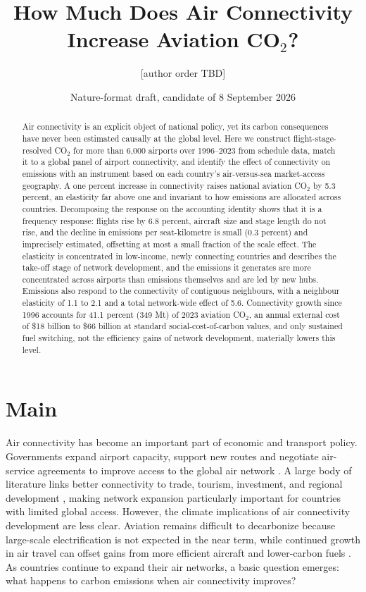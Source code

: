 \documentclass[12pt]{extarticle}
\title{How Much Does Air Connectivity Increase Aviation CO$_2$?}
\author{[author order TBD]}
\date{Nature-format draft, candidate of 8 September 2026}
\begin{document}
\maketitle

\begin{abstract}
\noindent Air connectivity is an explicit object of national policy, yet its
carbon consequences have never been estimated causally at the global level.
Here we construct flight-stage-resolved CO$_2$ for more than 6{,}000
airports over 1996--2023 from schedule data, match it to a global panel of
airport connectivity, and identify the effect of connectivity on emissions
with an instrument based on each country's air-versus-sea market-access
geography. A one percent increase in connectivity raises national aviation
CO$_2$ by 5.3 percent, an elasticity far above one and invariant to how
emissions are allocated across countries. Decomposing the response on the
accounting identity shows that it is a frequency response: flights rise by
6.8 percent, aircraft size and stage length do not rise, and the decline in
emissions per seat-kilometre is small (0.3 percent) and imprecisely
estimated, offsetting at most a small fraction of the scale effect. 
The elasticity is concentrated in low-income, newly connecting
countries and describes the take-off stage of network development, and
the emissions it generates are more concentrated across airports than
emissions themselves and are led by new hubs. Emissions also respond to the
connectivity of contiguous neighbours, with a neighbour elasticity of 1.1
to 2.1 and a total network-wide effect of 5.6. Connectivity growth since
1996 accounts for 41.1 percent (349 Mt) of 2023 aviation CO$_2$, an annual
external cost of \$18 billion to \$66 billion at standard social-cost-of-carbon
values, and only sustained fuel switching, not the efficiency gains of
network development, materially lowers this level.
\end{abstract}

\section*{Main}
Air connectivity has become an important part of economic and transport
policy. Governments expand airport capacity, support new routes and
negotiate air-service agreements to improve access to the global air
network \citep{fageda2018,piermartini2013}. A large body of literature
links better connectivity to trade, tourism, investment, and regional
development \citep{lenaerts2021,zhang2020}, making network expansion
particularly important for countries with limited global access. However,
the climate implications of air connectivity development are less clear.
Aviation remains difficult to decarbonize because large-scale
electrification is not expected in the near term, while continued growth
in air travel can offset gains from more efficient aircraft and
lower-carbon fuels \citep{bergero2023,sacchi2023}. As countries continue
to expand their air networks, a basic question emerges: what happens to
carbon emissions when air connectivity improves?
\end{document}
